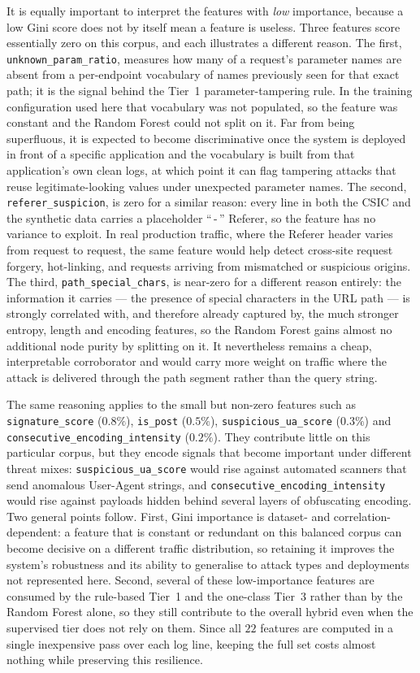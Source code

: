 \documentclass[../main.tex]{subfiles}
\begin{document}
It is equally important to interpret the features with \emph{low} importance,
because a low Gini score does not by itself mean a feature is useless. Three
features score essentially zero on this corpus, and each illustrates a
different reason. The first, \texttt{unknown\_param\_ratio}, measures how many
of a request's parameter names are absent from a per-endpoint vocabulary of
names previously seen for that exact path; it is the signal behind the Tier~1
parameter-tampering rule. In the training configuration used here that
vocabulary was not populated, so the feature was constant and the Random
Forest could not split on it. Far from being superfluous, it is expected to
become discriminative once the system is deployed in front of a specific
application and the vocabulary is built from that application's own clean
logs, at which point it can flag tampering attacks that reuse legitimate-looking
values under unexpected parameter names. The second, \texttt{referer\_suspicion},
is zero for a similar reason: every line in both the CSIC and the synthetic
data carries a placeholder ``\,-\,'' Referer, so the feature has no variance to
exploit. In real production traffic, where the Referer header varies from
request to request, the same feature would help detect cross-site request
forgery, hot-linking, and requests arriving from mismatched or suspicious
origins. The third, \texttt{path\_special\_chars}, is near-zero for a different
reason entirely: the information it carries --- the presence of special
characters in the URL path --- is strongly correlated with, and therefore
already captured by, the much stronger entropy, length and encoding features,
so the Random Forest gains almost no additional node purity by splitting on it.
It nevertheless remains a cheap, interpretable corroborator and would carry
more weight on traffic where the attack is delivered through the path segment
rather than the query string.

The same reasoning applies to the small but non-zero features such as
\texttt{signature\_score} ($0.8\%$), \texttt{is\_post} ($0.5\%$),
\texttt{suspicious\_ua\_score} ($0.3\%$) and
\texttt{consecutive\_encoding\_intensity} ($0.2\%$). They contribute little on
this particular corpus, but they encode signals that become important under
different threat mixes: \texttt{suspicious\_ua\_score} would rise against
automated scanners that send anomalous User-Agent strings, and
\texttt{consecutive\_encoding\_intensity} would rise against payloads hidden
behind several layers of obfuscating encoding. Two general points follow.
First, Gini importance is dataset- and correlation-dependent: a feature that is
constant or redundant on this balanced corpus can become decisive on a
different traffic distribution, so retaining it improves the system's
robustness and its ability to generalise to attack types and deployments not
represented here. Second, several of these low-importance features are
consumed by the rule-based Tier~1 and the one-class Tier~3 rather than by the
Random Forest alone, so they still contribute to the overall hybrid even when
the supervised tier does not rely on them. Since all $22$ features are computed
in a single inexpensive pass over each log line, keeping the full set costs
almost nothing while preserving this resilience.
\end{document}
